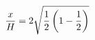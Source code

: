 \documentclass[preview]{standalone}
\begin{document}
\begin{align*}
\special{dvisvgm:raw <g id='unique000'>}\frac{x}{H} = 2 \sqrt{\frac{1}{2} \left( 1 - \frac{1}{2} \right)}\special{dvisvgm:raw </g>}
\end{align*}
\end{document}
